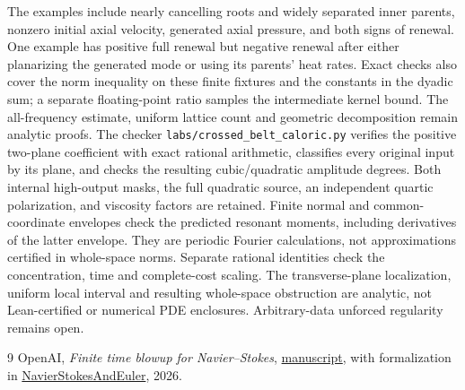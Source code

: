 \documentclass[11pt]{article}
\begin{document}
The examples include nearly cancelling roots and widely separated inner
parents, nonzero initial axial velocity, generated axial pressure, and
both signs of renewal. One example has positive full renewal but negative
renewal after either planarizing the generated mode or using its parents'
heat rates. Exact checks also cover the norm inequality on these finite
fixtures and the constants in the dyadic sum; a separate floating-point
ratio samples the intermediate kernel bound. The all-frequency estimate,
uniform lattice count and geometric decomposition remain analytic proofs.
The checker \texttt{labs/crossed\_belt\_caloric.py} verifies the positive
two-plane coefficient with exact rational arithmetic, classifies every
original input by its plane, and checks the resulting cubic/quadratic
amplitude degrees. Both internal high-output masks, the full quadratic
source, an independent quartic polarization, and viscosity factors are
retained. Finite normal and common-coordinate envelopes check the
predicted resonant moments, including derivatives of the latter envelope.
They are periodic Fourier calculations, not approximations certified in
whole-space norms. Separate rational identities check the concentration,
time and complete-cost scaling. The transverse-plane localization,
uniform local interval and resulting whole-space obstruction are analytic,
not Lean-certified or numerical PDE enclosures.
Arbitrary-data unforced regularity remains open.

\begin{thebibliography}{9}
OpenAI, \emph{Finite time blowup for Navier--Stokes},
\href{https://cdn.openai.com/pdf/32d9f210-8b73-45e0-91bc-82a30aef8a9a/navier-stokes.pdf}{manuscript},
with formalization in
\href{https://github.com/openai/NavierStokesAndEuler}{NavierStokesAndEuler}, 2026.
\end{thebibliography}
\end{document}
